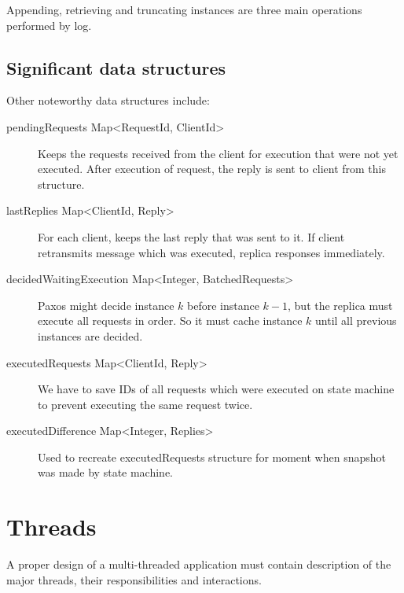 Appending, retrieving and truncating instances are three main operations per\-for\-med by log.

\subsection{Significant data structures}


Other noteworthy data structures include:
\label{subsubsec:significant_structures}
  \begin{description}
    \item[pendingRequests Map\textless RequestId, ClientId\textgreater] Keeps the requests received from the client for execution that were not yet executed. After execution of request, the reply is sent to client from this structure.
    \item[lastReplies Map\textless ClientId, Reply\textgreater] For each client, keeps the last reply that was sent to it. If client retransmits message which was executed, replica responses immediately.
    \item[decidedWaitingExecution Map\textless Integer, BatchedRequests\textgreater] Paxos might decide in\-stan\-ce $k$ before instance $k-1$, but the replica must execute all requests in order. So it must cache in\-stan\-ce $k$ until all previous instances are decided.
    \item[executedRequests Map\textless ClientId, Reply\textgreater] We have to save IDs of all requests which were executed on state machine to prevent executing the same request twice.
	\item[executedDifference Map\textless Integer, Replies\textgreater] Used to recreate executedRequests stru\-ctu\-re for moment when snapshot was made by state machine.
  \end{description}



\section{Threads}
\label{sec:threads}

A proper design of a multi-threaded application %
must contain description of the major threads, their responsibilities and interactions. 

